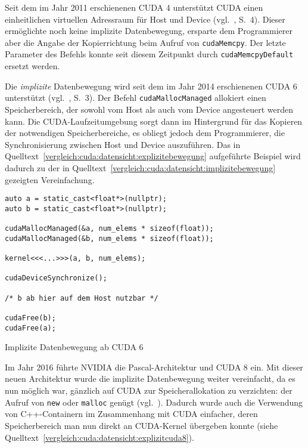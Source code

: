 Seit dem im Jahr 2011 erschienenen CUDA 4 unterstützt CUDA einen einheitlichen
virtuellen Adressraum für Host und Device (vgl.~\cite{cuda2011}, S.\ 4). Dieser
ermöglichte noch keine implizite Datenbewegung, ersparte dem Programmierer
aber die Angabe der Kopierrichtung beim Aufruf von
\texttt{cudaMemcpy}. Der letzte Parameter des Befehls konnte seit
diesem Zeitpunkt durch \texttt{cudaMemcpyDefault} ersetzt werden.

Die \textit{implizite} Datenbewegung wird seit dem im Jahr 2014 erschienenen
CUDA 6 unterstützt (vgl.~\cite{cuda2014}, S.\ 3). Der Befehl
\texttt{cudaMallocManaged} allokiert einen Speicherbereich, der sowohl
vom Host als auch vom Device angesteuert werden kann. Die CUDA-Laufzeitumgebung
sorgt dann im Hintergrund für das Kopieren der notwendigen Speicherbereiche, es
obliegt jedoch dem Programmierer, die Synchronisierung zwischen Host und Device
auszuführen. Das in Quelltext~\ref{vergleich:cuda:datensicht:explizitebewegung}
aufgeführte Beispiel wird dadurch zu der in
Quelltext~\ref{vergleich:cuda:datensicht:implizitebewegung} gezeigten
Vereinfachung.

\begin{code}
    \begin{verbatim}
auto a = static_cast<float*>(nullptr);
auto b = static_cast<float*>(nullptr);

cudaMallocManaged(&a, num_elems * sizeof(float));
cudaMallocManaged(&b, num_elems * sizeof(float));

kernel<<<...>>>(a, b, num_elems);

cudaDeviceSynchronize();

/* b ab hier auf dem Host nutzbar */

cudaFree(b);
cudaFree(a);
    \end{verbatim}
    \caption{Implizite Datenbewegung ab CUDA 6}
    \label{vergleich:cuda:datensicht:implizitebewegung}
\end{code}

Im Jahr 2016 führte NVIDIA die Pascal-Architektur und CUDA 8 ein. Mit dieser
neuen Architektur wurde die implizite Datenbewegung weiter vereinfacht, da es
nun möglich war, gänzlich auf CUDA zur Speicherallokation zu verzichten: der
Aufruf von \texttt{new} oder \texttt{malloc} genügt
(vgl.~\cite{harris2016}). Dadurch wurde auch die Verwendung von C++-Containern
im Zusammenhang mit CUDA einfacher, deren Speicherbereich man nun direkt an
CUDA-Kernel übergeben konnte (siehe
Quelltext~\ref{vergleich:cuda:datensicht:explizitcuda8}).

